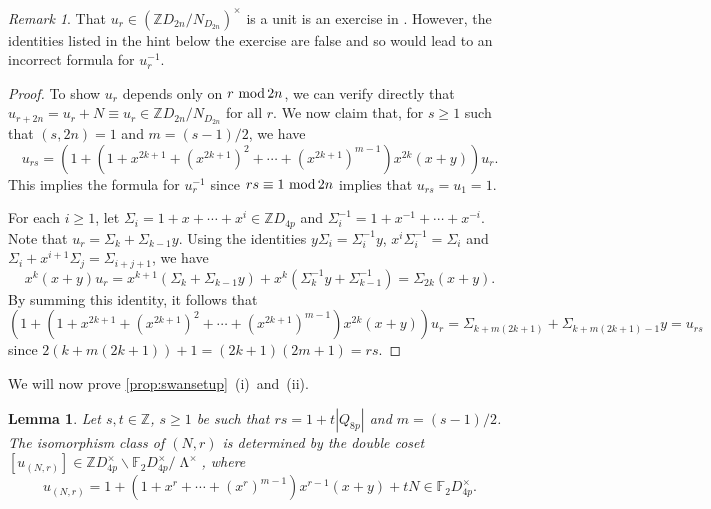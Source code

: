 \documentclass[11pt,leqno,a4paper]{amsart}
\newcommand{\Z}{\mathbb{Z}}
\newcommand{\F}{\mathbb{F}}
\renewcommand{\mod}{\,\,\text{\normalfont mod}\,}
\DeclareMathOperator{\LL}{\Lambda}
\newtheorem{lemma}[thm]{Lemma}
\theoremstyle{definition}
\theoremstyle{remark}
\newtheorem{remark}[thm]{Remark}
\theoremstyle{custom}
\begin{document}
\begin{remark}
That $u_r \in (\Z D_{2n} / N_{D_{2n}})^\times$ is a unit is an exercise in \cite[Exercise 53.3]{CR87}. However, the identities listed in the hint below the exercise are false and so would lead to an incorrect formula for $u_r^{-1}$.
\end{remark}

\begin{proof}
To show $u_r$ depends only on $r \mod 2n$, we can verify directly that $u_{r+2n} = u_r + N \equiv u_r \in \Z D_{2n} / N_{D_{2n}}$ for all $r$.
We now claim that, for $s \ge 1$ such that $(s,2n)=1$ and $m = (s-1)/2$, we have
\[ u_{rs} = (1+(1+x^{2k+1}+(x^{2k+1})^2 + \dotsb + (x^{2k+1})^{m-1})x^{2k}(x+y))u_r. \]
This implies the formula for $u_r^{-1}$ since $rs \equiv 1 \mod 2n$ implies that $u_{rs} = u_1 = 1$.

For each $i \ge 1$, let $\Sigma_i = 1+ x+ \dotsb + x^i \in \Z D_{4p}$ and $\Sigma_i^{-1} = 1+ x^{-1} + \dotsb + x^{-i}$. Note that $u_r = \Sigma_k + \Sigma_{k-1}y$. Using the identities $y \Sigma_i = \Sigma_i^{-1} y$, $x^{i}\Sigma_i^{-1} = \Sigma_i$ and $\Sigma_i+x^{i+1} \Sigma_j = \Sigma_{i+j+1}$, we have
\[ x^{k}(x+y)u_r = x^{k+1}(\Sigma_k + \Sigma_{k-1}y) + x^{k}(\Sigma_k^{-1}y + \Sigma_{k-1}^{-1}) = \Sigma_{2k}(x+y). \]	
By summing this identity, it follows that
\[ (1+(1+x^{2k+1}+(x^{2k+1})^2 + \dotsb +  (x^{2k+1})^{m-1})x^{2k}(x+y))u_r = \Sigma_{k+m(2k+1)} + \Sigma_{k+m(2k+1)-1}y = u_{rs} \]  	
since $2(k+m(2k+1))+1 = (2k+1)(2m+1) = rs$.	
\end{proof}

We will now prove \cref{prop:swansetup}~(i)~and~(ii).

\begin{lemma}
Let $s,t \in \Z$, $s \geq 1$ be such that $rs = 1+t|Q_{8p}|$ and $m = (s-1)/2$. The isomorphism class of $(N, r)$ is determined by the double coset $[u_{(N, r)}] \in \Z D_{4p}^\times \backslash \F_2 D_{4p}^\times /{\LL^\times}$, where
\[ u_{(N,r)} = 1+(1+x^r + \dotsb +  (x^r)^{m-1})x^{r-1}(x+y) + tN \in \F_2 D_{4p}^\times. \]
\end{lemma}
\end{document}
